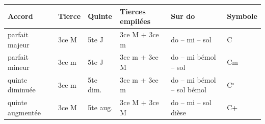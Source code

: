 \setlength{\tabcolsep}{4pt}%
\begin{tabular}{@{}l l l l l l@{}}
\toprule
\textbf{Accord} & \textbf{Tierce} & \textbf{Quinte} & \textbf{Tierces empilées} & \textbf{Sur do} & \textbf{Symbole} \\
\midrule
parfait majeur & 3ce M & 5te J & 3ce M + 3ce m & do -- mi -- sol & C \\
parfait mineur & 3ce m & 5te J & 3ce m + 3ce M & do -- mi bémol -- sol & Cm \\
quinte diminuée & 3ce m & 5te dim. & 3ce m + 3ce m & do -- mi bémol -- sol bémol & C$^{\circ}$ \\
quinte augmentée & 3ce M & 5te aug. & 3ce M + 3ce M & do -- mi -- sol dièse & C+ \\
\bottomrule
\end{tabular}

